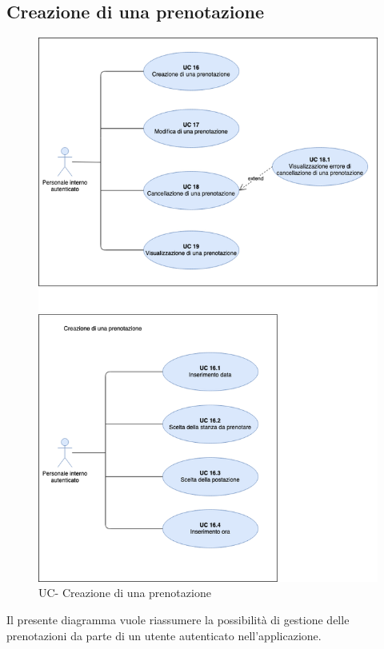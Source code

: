 \subsection{Creazione di una prenotazione}

\begin{figure}[h]
  \centering
    \includegraphics[scale=0.5]{src/CasiDUso/immagini/UC-creazionePrenotazione.png}
  \caption{UC- Creazione di una prenotazione}
\end{figure}

Il presente diagramma vuole riassumere la possibilità di gestione delle prenotazioni da parte di un utente autenticato nell’applicazione.

